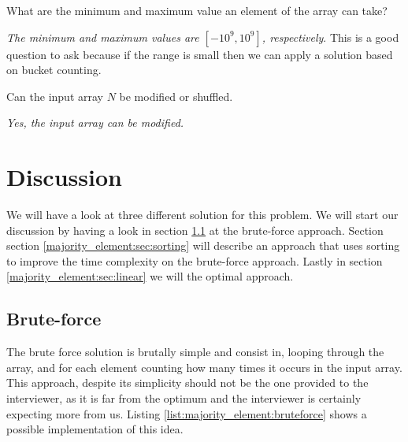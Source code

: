 \begin{QandA}
	\item \begin{questionitem} \begin{question} What are the minimum and maximum value an element of the array can take?   \end{question} 	 
    \begin{answered}
		\textit{The minimum and maximum values are $[-10^9, 10^9]$, respectively}.
		This is a good question to ask because if the range is small then we can apply a solution based on bucket counting.
	\end{answered} \end{questionitem}

	\item \begin{questionitem} \begin{question} Can the input array $N$ be modified or shuffled.   \end{question} 	 
    \begin{answered}
		\textit{Yes, the input array can be modified.}
	\end{answered} \end{questionitem}
\end{QandA}

\section{Discussion}
\label{majority_element:sec:discussion}
We will have a look at three different solution for this problem. We will start our discussion by having a look in section \ref{majority_element:sec:bruteforce} at the brute-force approach. Section section \ref{majority_element:sec:sorting} will describe an approach that uses sorting to improve the time complexity on the brute-force approach. Lastly in section \ref{majority_element:sec:linear} we will the optimal approach.

\subsection{Brute-force}
\label{majority_element:sec:bruteforce}
The brute force solution is brutally simple and consist in, looping through the array, and for each element counting how many times it occurs in the input array. This approach, despite its simplicity should not be the one provided to the interviewer, as it is far from the optimum and the interviewer is certainly expecting more from us.
Listing \ref{list:majority_element:bruteforce} shows a possible implementation of this idea. 

